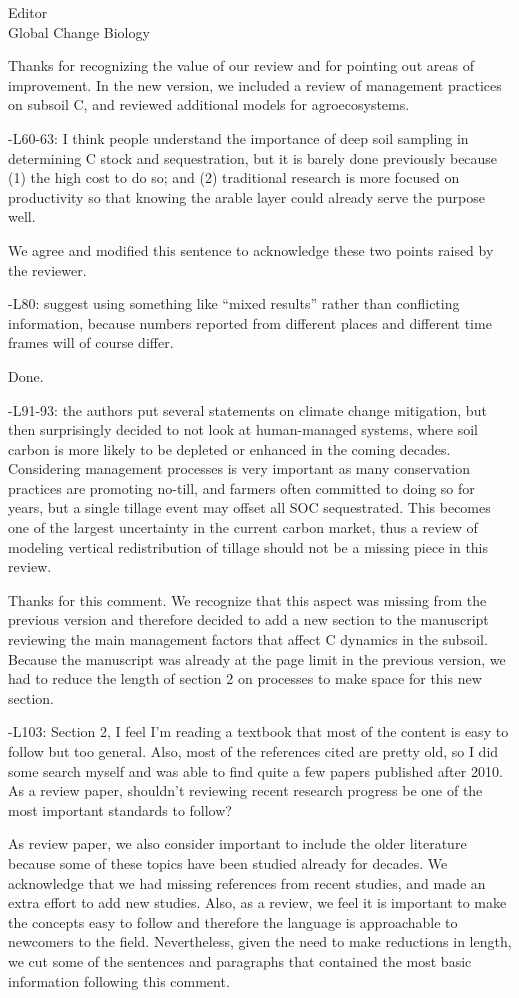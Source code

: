 \documentclass[11pt]{bgcletter}
\newcommand{\answer}[1] {
{\color{cyan} #1}
}
\begin{document}
\begin{letter}{Editor\\
   Global Change Biology
}
\answer{Thanks for recognizing the value of our review and for pointing out areas of improvement. In the new version, we included a review of management practices on subsoil C, and reviewed additional models for agroecosystems. }

-L60-63: I think people understand the importance of deep soil sampling in determining C stock and sequestration, but it is barely done previously because (1) the high cost to do so; and (2) traditional research is more focused on productivity so that knowing the arable layer could already serve the purpose well.

\answer{We agree and modified this sentence to acknowledge these two points raised by the reviewer. }

-L80: suggest using something like ``mixed results'' rather than conflicting information, because numbers reported from different places and different time frames will of course differ.

\answer{Done.}

-L91-93: the authors put several statements on climate change mitigation, but then surprisingly decided to not look at human-managed systems, where soil carbon is more likely to be depleted or enhanced in the coming decades. Considering management processes is very important as many conservation practices are promoting no-till, and farmers often committed to doing so for years, but a single tillage event may offset all SOC sequestrated. This becomes one of the largest uncertainty in the current carbon market, thus a review of modeling vertical redistribution of tillage should not be a missing piece in this review.

\answer{Thanks for this comment. We recognize that this aspect was missing from the previous version and therefore decided to add a new section to the manuscript reviewing the main management factors that affect C dynamics in the subsoil. Because the manuscript was already at the page limit in the previous version, we had to reduce the length of section 2 on processes to make space for this new section.}

-L103: Section 2, I feel I'm reading a textbook that most of the content is easy to follow but too general. Also, most of the references cited are pretty old, so I did some search myself and was able to find quite a few papers published after 2010. As a review paper, shouldn't reviewing recent research progress be one of the most important standards to follow?

\answer{As review paper, we also consider important to include the older literature because some of these topics have been studied already for decades. We acknowledge that we had missing references from recent studies, and made an extra effort to add new studies. Also, as a review, we feel it is important to make the concepts easy to follow and therefore the language is approachable to newcomers to the field. Nevertheless, given the need to make reductions in length, we cut some of the sentences and paragraphs that contained the most basic information following this comment.}


\end{letter}
\end{document}
